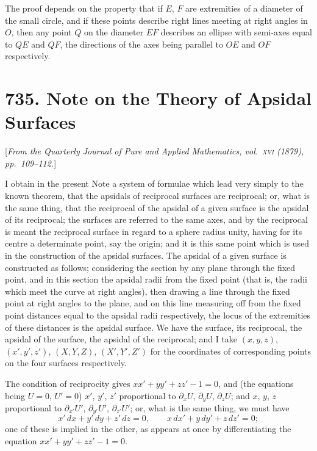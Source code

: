 \documentclass[12pt,a4paper]{article}
\theoremstyle{plain}
\begin{document}
The proof depends on the property that if $E$, $F$ are extremities of a
diameter of the small circle, and if these points describe right lines meeting
at right angles in $O$, then any point $Q$ on the diameter $EF$ describes
an ellipse with semi-axes equal to $QE$ and $QF$, the directions of the axes
being parallel to $OE$ and $OF$ respectively.

\newpage
\section*{735. Note on the Theory of Apsidal Surfaces}

[\textit{From the Quarterly Journal of Pure and Applied Mathematics, vol.~\textsc{xvi} (1879),
pp.~109--112.}]

I obtain in the present Note a system of formulae which lead very
simply to the known theorem, that the apsidals of reciprocal surfaces are
reciprocal; or, what is the same thing, that the reciprocal of the apsidal of
a given surface is the apsidal of its reciprocal; the surfaces are referred to
the same axes, and by the reciprocal is meant the reciprocal surface in
regard to a sphere radius unity, having for its centre a determinate point,
say the origin; and it is this same point which is used in the construction
of the apsidal surfaces. The apsidal of a given surface is constructed as
follows; considering the section by any plane through the fixed point, and
in this section the apsidal radii from the fixed point (that is, the radii which
meet the curve at right angles), then drawing a line through the fixed point
at right angles to the plane, and on this line measuring off from the fixed
point distances equal to the apsidal radii respectively, the locus of the
extremities of these distances is the apsidal surface. We have the surface,
its reciprocal, the apsidal of the surface, the apsidal of the reciprocal; and
I take $(x,y,z)$, $(x',y',z')$, $(X,Y,Z)$, $(X',Y',Z')$ for the coordinates of
corresponding points on the four surfaces respectively.

The condition of reciprocity gives $xx'+yy'+zz'-1=0$, and (the
equations being $U=0$, $U'=0$) $x'$, $y'$, $z'$ proportional to
$\partial_xU$, $\partial_yU$, $\partial_zU$; and $x$, $y$, $z$ proportional to
$\partial_{x'}U'$, $\partial_{y'}U'$, $\partial_{z'}U'$; or, what is the same thing,
we must have
\[
x'\,dx + y'\,dy + z'\,dz = 0,\qquad
x\,dx' + y\,dy' + z\,dz' = 0;
\]
one of these is implied in the other, as appears at once by differentiating
the equation $xx'+yy'+zz'-1=0$.
\end{document}
